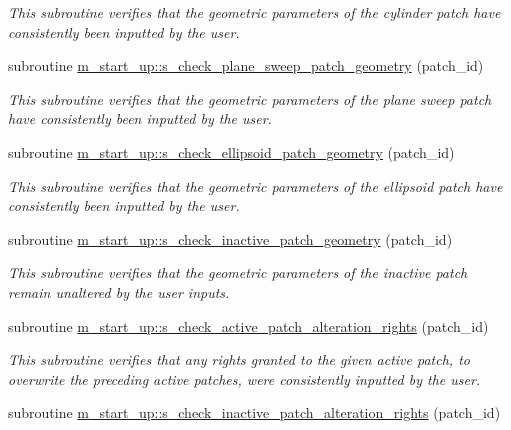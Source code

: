 \begin{DoxyCompactItemize}
\begin{DoxyCompactList}\small\item\em This subroutine verifies that the geometric parameters of the cylinder patch have consistently been inputted by the user. \end{DoxyCompactList}\item 
subroutine \hyperlink{namespacem__start__up_aae294c405210613a2466358f3af3fd90}{m\+\_\+start\+\_\+up\+::s\+\_\+check\+\_\+plane\+\_\+sweep\+\_\+patch\+\_\+geometry} (patch\+\_\+id)
\begin{DoxyCompactList}\small\item\em This subroutine verifies that the geometric parameters of the plane sweep patch have consistently been inputted by the user. \end{DoxyCompactList}\item 
subroutine \hyperlink{namespacem__start__up_a9cb00dcfe248d67b64c361ac57b6a269}{m\+\_\+start\+\_\+up\+::s\+\_\+check\+\_\+ellipsoid\+\_\+patch\+\_\+geometry} (patch\+\_\+id)
\begin{DoxyCompactList}\small\item\em This subroutine verifies that the geometric parameters of the ellipsoid patch have consistently been inputted by the user. \end{DoxyCompactList}\item 
subroutine \hyperlink{namespacem__start__up_a1a6b2eb124c5710f9078ea787be5d650}{m\+\_\+start\+\_\+up\+::s\+\_\+check\+\_\+inactive\+\_\+patch\+\_\+geometry} (patch\+\_\+id)
\begin{DoxyCompactList}\small\item\em This subroutine verifies that the geometric parameters of the inactive patch remain unaltered by the user inputs. \end{DoxyCompactList}\item 
subroutine \hyperlink{namespacem__start__up_ada150cf67ef5f91529ac7eda46ad5492}{m\+\_\+start\+\_\+up\+::s\+\_\+check\+\_\+active\+\_\+patch\+\_\+alteration\+\_\+rights} (patch\+\_\+id)
\begin{DoxyCompactList}\small\item\em This subroutine verifies that any rights granted to the given active patch, to overwrite the preceding active patches, were consistently inputted by the user. \end{DoxyCompactList}\item 
subroutine \hyperlink{namespacem__start__up_a3bf3a6bd18c4f5c2e4aefec6ad9664d8}{m\+\_\+start\+\_\+up\+::s\+\_\+check\+\_\+inactive\+\_\+patch\+\_\+alteration\+\_\+rights} (patch\+\_\+id)

\end{DoxyCompactItemize}
